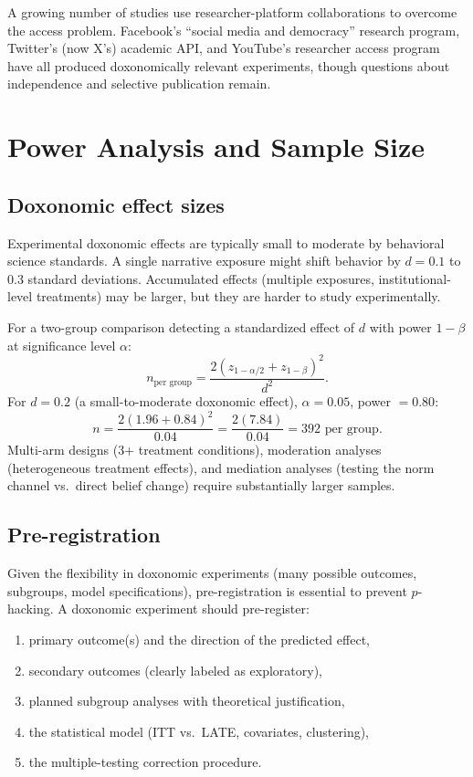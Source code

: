 A growing number of studies use researcher-platform collaborations to overcome the access problem.
Facebook's ``social media and democracy'' research program, Twitter's (now X's) academic API, and YouTube's researcher access program have all produced doxonomically relevant experiments, though questions about independence and selective publication remain.

\section{Power Analysis and Sample Size}
\label{sec:ch19-power}

\subsection{Doxonomic effect sizes}

Experimental doxonomic effects are typically small to moderate by behavioral science standards.
A single narrative exposure might shift behavior by $d = 0.1$ to $0.3$ standard deviations.
Accumulated effects (multiple exposures, institutional-level treatments) may be larger, but they are harder to study experimentally.

\begin{proposition}
\label{prop:sample-size}
For a two-group comparison detecting a standardized effect of $d$ with power $1 - \beta$ at significance level $\alpha$:
\[
  n_{\text{per group}} = \frac{2(z_{1-\alpha/2} + z_{1-\beta})^2}{d^2}.
\]
For $d = 0.2$ (a small-to-moderate doxonomic effect), $\alpha = 0.05$, power $= 0.80$:
\[
  n = \frac{2(1.96 + 0.84)^2}{0.04} = \frac{2(7.84)}{0.04} = 392 \text{ per group}.
\]
Multi-arm designs (3+ treatment conditions), moderation analyses (heterogeneous treatment effects), and mediation analyses (testing the norm channel vs.\ direct belief change) require substantially larger samples.
\end{proposition}

\subsection{Pre-registration}

Given the flexibility in doxonomic experiments (many possible outcomes, subgroups, model specifications), pre-registration is essential to prevent $p$-hacking.
A doxonomic experiment should pre-register:
\begin{enumerate}[nosep]
  \item primary outcome(s) and the direction of the predicted effect,
  \item secondary outcomes (clearly labeled as exploratory),
  \item planned subgroup analyses with theoretical justification,
  \item the statistical model (ITT vs.\ LATE, covariates, clustering),
  \item the multiple-testing correction procedure.
\end{enumerate}

